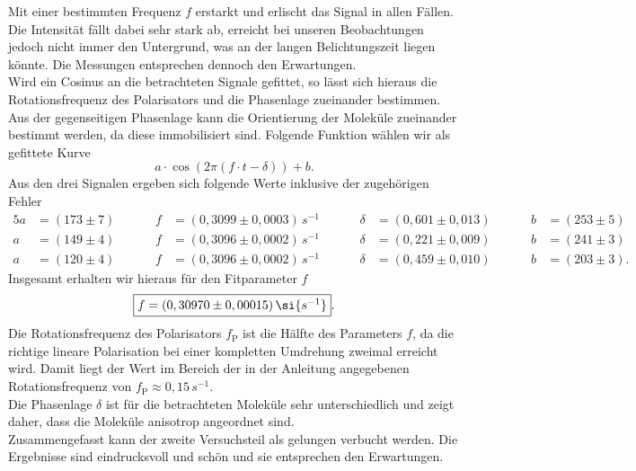 Mit einer bestimmten Frequenz $f$ erstarkt und erlischt das Signal in allen Fällen. 
Die Intensität fällt dabei sehr stark ab, erreicht bei unseren Beobachtungen jedoch 
nicht immer den Untergrund, was an der langen Belichtungszeit liegen könnte. 
Die Messungen entsprechen dennoch den Erwartungen. \\
Wird ein Cosinus an die betrachteten Signale gefittet, so lässt sich hieraus
die Rotationsfrequenz des Polarisators und die Phasenlage zueinander bestimmen. 
Aus der gegenseitigen Phasenlage kann die Orientierung der Moleküle zueinander bestimmt
werden, da diese immobilisiert sind. 
Folgende Funktion wählen wir als gefittete Kurve
\begin{equation}
    a\cdot\cos\left(2\pi(f\cdot t-\delta)\right) + b.
\end{equation}
Aus den drei Signalen ergeben sich folgende Werte inklusive der zugehörigen Fehler
\begin{alignat}{5}
    a &= (173 \pm 7)\hspace{1cm}& f &= (0,3099 \pm 0,0003)\,\si{s^{-1}}\hspace{1cm}& \delta &= (0,601 \pm 0,013)\hspace{1cm}& b &= (253 \pm 5) \\
    a &= (149 \pm 4)\hspace{1cm}& f &= (0,3096 \pm 0,0002)\,\si{s^{-1}}\hspace{1cm}& \delta &= (0,221 \pm 0,009)\hspace{1cm}& b &= (241 \pm 3) \\
    a &= (120 \pm 4)\hspace{1cm}& f &= (0,3096 \pm 0,0002)\,\si{s^{-1}}\hspace{1cm}& \delta &= (0,459 \pm 0,010)\hspace{1cm}& b &= (203 \pm 3).
\end{alignat}
Insgesamt erhalten wir hieraus für den Fitparameter $f$
\begin{equation}
    \fbox{$f = (0,30970 \pm 0,00015)\,\si{s^{-1}}$}.
\end{equation}
Die Rotationsfrequenz des Polarisators $f_{\text{P}}$ ist die Hälfte des Parameters $f$, 
da die richtige lineare Polarisation bei einer kompletten Umdrehung zweimal erreicht wird. 
Damit liegt der Wert im Bereich der in der Anleitung angegebenen Rotationsfrequenz von 
$f_{\text{P}}\approx0,15\,\si{s^{-1}}$. \\
Die Phasenlage $\delta$ ist für die betrachteten Moleküle sehr unterschiedlich und zeigt daher, 
dass die Moleküle anisotrop angeordnet sind. \\ 
Zusammengefasst kann der zweite Versuchsteil als gelungen verbucht werden. Die Ergebnisse sind eindrucksvoll 
und schön und sie entsprechen den Erwartungen. \\

